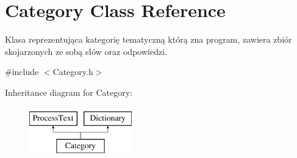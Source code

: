 \hypertarget{class_category}{}\section{Category Class Reference}
\label{class_category}


Klasa reprezentująca kategorię tematyczną którą zna program, zawiera zbiór skojarzonych ze sobą słów oraz odpowiedzi.  




{\ttfamily \#include $<$Category.\+h$>$}

Inheritance diagram for Category\+:\begin{figure}[H]
\begin{center}
\leavevmode
\includegraphics[height=2.000000cm]{class_category}
\end{center}
\end{figure}
